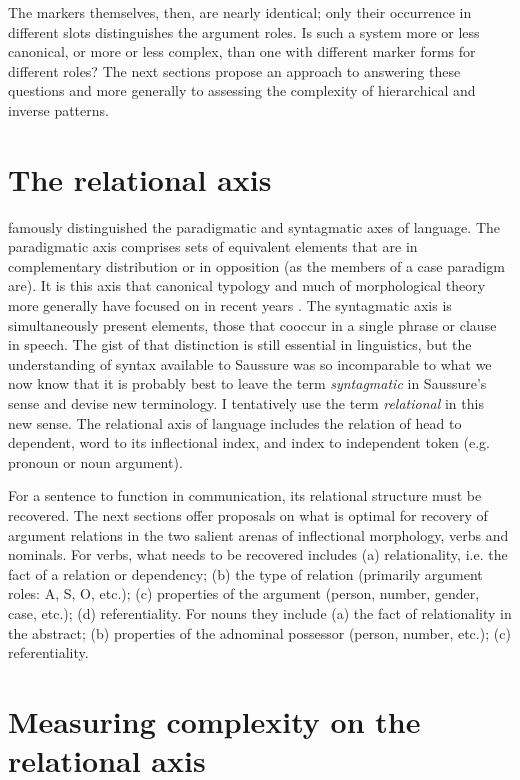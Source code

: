 \documentclass[output=paper,hidelinks]{langscibook}
\begin{document}
The markers themselves, then, are nearly identical; only their occurrence in different slots distinguishes the argument roles.  Is such a system more or less canonical, or more or less complex, than one with different marker forms for different roles?  The next sections propose an approach to answering these questions and more generally to assessing the complexity of hierarchical and inverse patterns.

\section{The relational axis}

\citet{Saussure1916} famously distinguished the paradigmatic and syntagmatic axes of language.  The paradigmatic axis comprises sets of equivalent elements that are in complementary distribution or in opposition (as the members of a case paradigm are).  It is this axis that canonical typology and much of morphological theory more generally have focused on in recent years \citep[e.g.][]{Bond2019}.  The syntagmatic axis is simultaneously present elements, those that cooccur in a single phrase or clause in speech.  The gist of that distinction is still essential in linguistics, but the understanding of syntax available to Saussure was so incomparable to what we now know that it is probably best to leave the term \textit{syntagmatic} in Saussure's sense and devise new terminology.  I tentatively use the term \textit{relational} in this new sense.  The relational axis of language includes the relation of head to dependent, word to its inflectional index, and index to independent token (e.g. pronoun or noun argument).  

For a sentence to function in communication, its relational structure must be recovered.  The next sections offer proposals on what is optimal for recovery of argument relations in the two salient arenas of inflectional morphology, verbs and nominals.  For verbs, what needs to be recovered includes (a) relationality, i.e. the fact of a relation or dependency; (b) the type of relation (primarily argument roles: A, S, O, etc.); (c) properties of the argument (person, number, gender, case, etc.); (d) referentiality.  For nouns they include (a) the fact of relationality in the abstract; (b) properties of the adnominal possessor (person, number, etc.); (c) referentiality.


\section{Measuring complexity on the relational axis}
\end{document}
